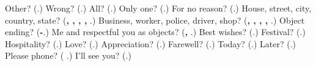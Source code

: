 \begin{tcolorbox}[breakable,colback=teal!4,colframe=teal!35!black,title={Before you move on}]
Other? (\textbf{}.) Wrong? (\textbf{}.) All? (\textbf{}.) Only one? (\textbf{}.) For no reason? (\textbf{}.) House, street, city, country, state? (\textbf{, , , , }.) Business, worker, police, driver, shop? (\textbf{, , , , }.) Object ending? (\textbf{-}.) Me and respectful you as objects? (\textbf{, }.) Best wishes? (\textbf{}.) Festival? (\textbf{}.) Hospitality? (\textbf{}.) Love? (\textbf{}.) Appreciation? (\textbf{}.) Farewell? (\textbf{}.) Today? (\textbf{}.) Later? (\textbf{}.) Please phone? (\textbf{ }.) I'll see you? (\textbf{}.)
\end{tcolorbox}

